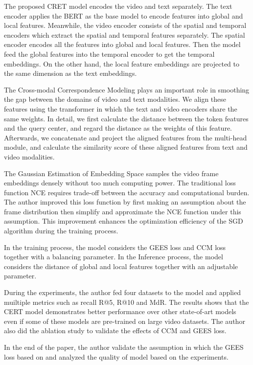 \documentclass{article}
\begin{document}
The proposed CRET model encodes the video and text separately.  The text encoder applies the BERT as the base model to encode features into global and local features. Meanwhile, the video encoder consists of the spatial and temporal encoders which extract the spatial and temporal features separately. The spatial encoder encodes all the features into global and local features. Then the model feed the global features into the temporal encoder to get the temporal embeddings. On the other hand, the local feature embeddings are projected to the same dimension as the text embeddings.

The Cross-modal Correspondence Modeling plays an important role in smoothing the gap between the domains of video and text modalities. We align these features using the transformer in which the text and video encoders share the same weights. In detail, we first calculate the distance between the token features and the query center, and regard the distance as the weights of this feature. Afterwards, we concatenate and project the aligned features from the multi-head module, and calculate the similarity score of these aligned features from text and video modalities.

The Gaussian Estimation of Embedding Space samples the video frame embeddings densely without too much computing power. The traditional loss function NCE requires trade-off between the accuracy and computational burden. The author improved this loss function by first making an assumption about the frame distribution then simplify and approximate the NCE function under this assumption. This improvement enhances the optimization efficiency of the SGD algorithm during the training process.

In the training process, the model considers the GEES loss and CCM loss together with a balancing parameter. In the Inference process, the model considers the distance of global and local features together with an adjustable parameter.

During the experiments, the author fed four datasets to the model and applied muiltiple metrics such as recall R@5, R@10 and MdR. The results shows that the CERT model demonstrates better performance over other state-of-art models even if some of these models are pre-trained on large video datasets. The author also did the ablation study to validate the effects of CCM and GEES loss.

In the end of the paper, the author validate the assumption in which the GEES loss based on and analyzed the quality of model based on the experiments.
\end{document}

